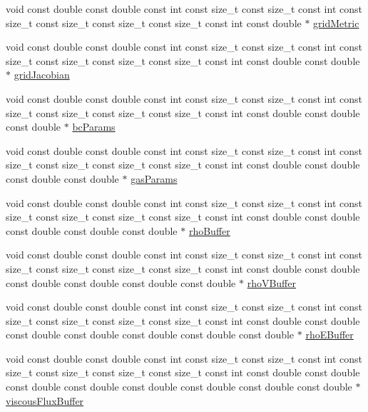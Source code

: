 \begin{DoxyCompactItemize}
\item 
void const double const double const int const size\+\_\+t const size\+\_\+t const int const size\+\_\+t const size\+\_\+t const size\+\_\+t const size\+\_\+t const int const double $\ast$ \hyperlink{SATKernels_8H_a958e0724b892fe1870c5f76f17abb768}{grid\+Metric}
\item 
void const double const double const int const size\+\_\+t const size\+\_\+t const int const size\+\_\+t const size\+\_\+t const size\+\_\+t const size\+\_\+t const int const double const double $\ast$ \hyperlink{SATKernels_8H_aaf1e04690bc21cac2a406748b963e345}{grid\+Jacobian}
\item 
void const double const double const int const size\+\_\+t const size\+\_\+t const int const size\+\_\+t const size\+\_\+t const size\+\_\+t const size\+\_\+t const int const double const double const double $\ast$ \hyperlink{SATKernels_8H_a498f997b8d8f027ad03132065bd1819d}{bc\+Params}
\item 
void const double const double const int const size\+\_\+t const size\+\_\+t const int const size\+\_\+t const size\+\_\+t const size\+\_\+t const size\+\_\+t const int const double const double const double const double $\ast$ \hyperlink{SATKernels_8H_a63fe892dfb364d26ef895affd963a88e}{gas\+Params}
\item 
void const double const double const int const size\+\_\+t const size\+\_\+t const int const size\+\_\+t const size\+\_\+t const size\+\_\+t const size\+\_\+t const int const double const double const double const double const double $\ast$ \hyperlink{SATKernels_8H_ace59278fbe93d9a310adbae856537ab6}{rho\+Buffer}
\item 
void const double const double const int const size\+\_\+t const size\+\_\+t const int const size\+\_\+t const size\+\_\+t const size\+\_\+t const size\+\_\+t const int const double const double const double const double const double const double $\ast$ \hyperlink{SATKernels_8H_a77e93407ab66bf5f0aa4f6d87b62ec81}{rho\+V\+Buffer}
\item 
void const double const double const int const size\+\_\+t const size\+\_\+t const int const size\+\_\+t const size\+\_\+t const size\+\_\+t const size\+\_\+t const int const double const double const double const double const double const double const double $\ast$ \hyperlink{SATKernels_8H_a08911833ae2c771ec222ca0450100363}{rho\+E\+Buffer}
\item 
void const double const double const int const size\+\_\+t const size\+\_\+t const int const size\+\_\+t const size\+\_\+t const size\+\_\+t const size\+\_\+t const int const double const double const double const double const double const double const double const double $\ast$ \hyperlink{SATKernels_8H_a106c22d96843fe9efa651233fc90cb72}{viscous\+Flux\+Buffer}

\end{DoxyCompactItemize}
